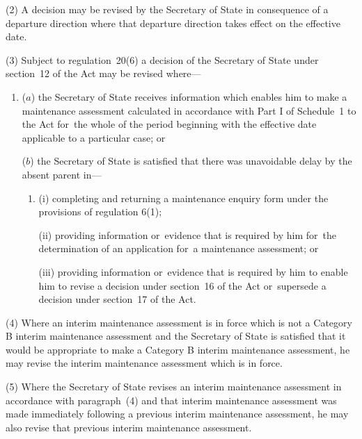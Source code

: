 \documentclass[a4paper,12pt]{article}
\begin{document}
(2) A decision may be revised by the Secretary of State in consequence of a departure direction where that departure direction takes effect on the effective date.

(3) Subject to regulation~20(6) a decision of the Secretary of State under section~12 of the Act may be revised where---
\begin{enumerate}\item[]
($a$) the Secretary of State receives information which enables him to make a maintenance assessment calculated in accordance with Part I of Schedule~1 to the Act for~the whole of the period beginning with the effective date applicable to a particular case; or

($b$) the Secretary of State is satisfied that there was unavoidable delay by the absent parent in---
\begin{enumerate}\item[]
(i) completing and returning a maintenance enquiry form under the provisions of regulation 6(1);

(ii) providing information or~evidence that is required by him for~the determination of an application for~a maintenance assessment; or

(iii) providing information or~evidence that is required by him to enable him to revise a decision under section~16 of the Act or~supersede a decision under section~17 of the Act.
\end{enumerate}
\end{enumerate}

(4) Where an interim maintenance assessment is in force which is not a Category B interim maintenance assessment and the Secretary of State is satisfied that it would be appropriate to make a Category B interim maintenance assessment, he may revise the interim maintenance assessment which is in force.

(5) Where the Secretary of State revises an interim maintenance assessment in accordance with paragraph~(4) and that interim maintenance assessment was made immediately following a previous interim maintenance assessment, he may also revise that previous interim maintenance assessment.
\end{document}
